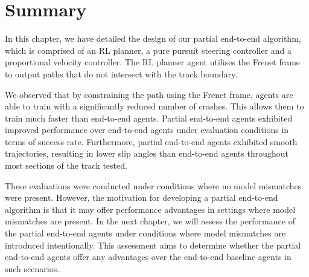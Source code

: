 \section{Summary}

In this chapter, we have detailed the design of our partial end-to-end algorithm, which is comprised of an RL planner, a pure pursuit steering controller and a proportional velocity controller.
The RL planner agent utilises the Frenet frame to output paths that do not intersect with the track boundary.

We observed that by constraining the path using the Frenet frame, agents are able to train with a significantly reduced number of crashes.
This allows them to train much faster than end-to-end agents.
Partial end-to-end agents exhibited improved performance over end-to-end agents under evaluation conditions in terms of success rate.
Furthermore, partial end-to-end agents exhibited smooth trajectories, resulting in lower slip angles than end-to-end agents throughout most sections of the track tested.


These evaluations were conducted under conditions where no model mismatches were present.
However, the motivation for developing a partial end-to-end algorithm is that it may offer performance advantages in settings where model mismatches are present.
In the next chapter, we will assess the performance of the partial end-to-end agents under conditions where model mismatches are introduced intentionally. 
This assessment aims to determine whether the partial end-to-end agents offer any advantages over the end-to-end baseline agents in such scenarios.


